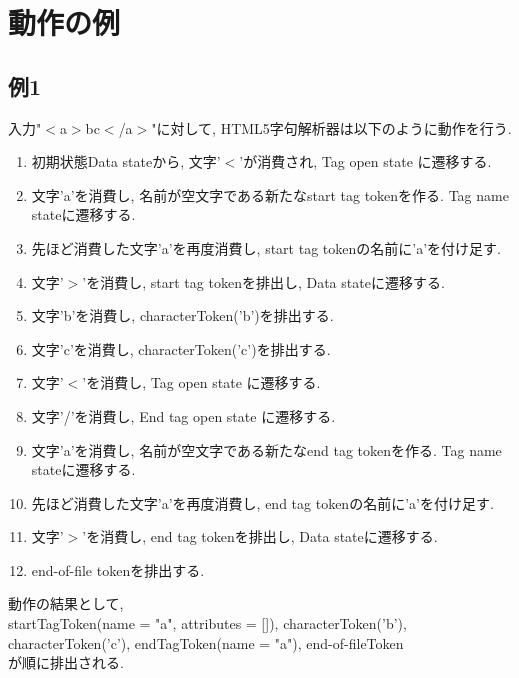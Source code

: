 \documentclass[uplatex,a4j]{jsreport}
\begin{document}
\section{動作の例}
\subsection{例1}
入力"$<$a$>$bc$<$/a$>$"に対して, HTML5字句解析器は以下のように動作を行う.\\
\begin{enumerate}
    \item 初期状態Data stateから, 文字'$<$'が消費され, Tag open state に遷移する.
    \item 文字'a'を消費し, 名前が空文字である新たなstart tag tokenを作る. Tag name stateに遷移する.
    \item 先ほど消費した文字'a'を再度消費し, start tag tokenの名前に'a'を付け足す.
    \item 文字'$>$'を消費し, start tag tokenを排出し, Data stateに遷移する.
    \item 文字'b'を消費し, characterToken('b')を排出する.
    \item 文字'c'を消費し, characterToken('c')を排出する.
    \item 文字'$<$'を消費し, Tag open state に遷移する.
    \item 文字'/'を消費し, End tag open state に遷移する.
    \item 文字'a'を消費し, 名前が空文字である新たなend tag tokenを作る. Tag name stateに遷移する.
    \item 先ほど消費した文字'a'を再度消費し, end tag tokenの名前に'a'を付け足す.
    \item 文字'$>$'を消費し, end tag tokenを排出し, Data stateに遷移する.
    \item end-of-file tokenを排出する.
\end{enumerate}
動作の結果として,\\
startTagToken(name = "a", attributes = []), characterToken('b'), characterToken('c'), endTagToken(name = "a"), end-of-fileToken\\
が順に排出される.
\end{document}
